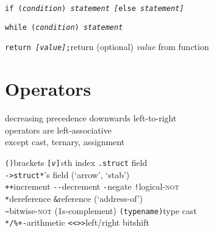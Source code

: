 \documentclass[8pt]{article}
\newcommand{\Cc}[1]{\texttt{#1}}
\newcommand{\kw}[1]{\textcolor{black!40!lime}{\texttt{#1}}} %
\newcommand{\ty}[1]{\textcolor{blue!80}{\texttt{#1}}} %
\newcommand{\opt}[1]{\textrm{\textit{#1}}} %
\begin{document}
\begin{multicols}{3}
\Cc{\kw{if} (\opt{condition}) \opt{statement} \opt{[}\kw{else} \opt{statement}\opt{]}}


\Cc{\kw{while} (\opt{condition}) \opt{statement}}%

\Cc{\kw{return} \opt{[value]};}\quad return (optional) \opt{value} from function%

\section*{Operators}

\begin{center}
decreasing precedence downwards left-to-right\\
operators are left-associative\\
except cast, ternary, assignment
\end{center} 

\Cc{()}\quad brackets \hfill
\Cc{[\opt{v}]}\quad \opt{v}th index \hfill
\Cc{.}\quad \ty{struct} field \\
\Cc{->}\quad \ty{struct*}'s field (`arrow', `stab') \\
\Cc{++}\quad increment  \hfill
\Cc{-{}-}\quad decrement \hfill
\Cc{-}\quad negate \hfill
\Cc{!}\quad logical-\textsc{not} \\

\Cc{*}\quad dereference \hfill
\Cc{\&}\quad reference (`address-of') \\
\Cc{\~}\quad bitwise-\textsc{not} (1s-complement) \hfill
\Cc{(\ty{typename})}\quad type cast \\
\Cc{*}\quad\Cc{/}\quad\Cc{\%}\quad\Cc{+}\quad\Cc{-}\quad arithmetic \hfill
\Cc{<<}\quad\Cc{>>}\quad left/right bitshift


\end{multicols}
\end{document}
